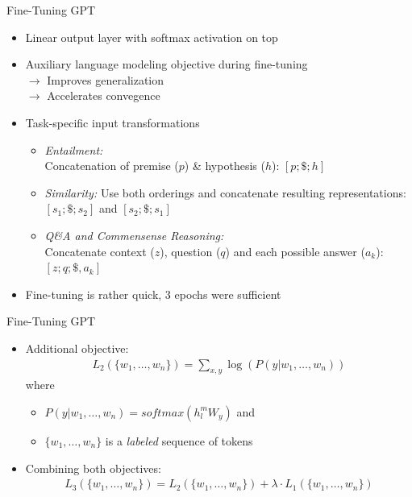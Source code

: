
\begin{vbframe}{Fine-Tuning GPT}

\vfill
			
\begin{itemize}
		\item Linear output layer with softmax activation on top
		\item Auxiliary language modeling objective during fine-tuning\\
					$\rightarrow$ Improves generalization\\
					$\rightarrow$ Accelerates convegence
		\item Task-specific input transformations
					\begin{itemize}
						\item \textit{Entailment:} \\ Concatenation of premise ($p$) \& hypothesis ($h$): $[p; \$; h]$
						\item \textit{Similarity:} Use both orderings and concatenate resulting representations: $[s_1; \$; s_2]$ and $[s_2; \$; s_1]$
						\item \textit{Q\&A and Commensense Reasoning:} \\ Concatenate context ($z$), question ($q$) and each possible answer ($a_k$): $[z; q; \$, a_k]$
					\end{itemize}
		\item Fine-tuning is rather quick, 3 epochs were sufficient
\end{itemize}

\vfill

\end{vbframe}


\begin{vbframe}{Fine-Tuning GPT}

\vfill

\begin{itemize}
		\item Additional objective:
					\begin{align*}
						L_2(\{w_1, \hdots, w_n\}) = \sum_{x,y} \log(P(y | w_1, \hdots, w_n))
					\end{align*}		
					where 
				\begin{itemize}
					\item $P(y | w_1, \hdots, w_n) = softmax(h_l^m W_y)$ and 
					\item $\{w_1, \hdots, w_n\}$ is a \textit{labeled} sequence of tokens
				\end{itemize}
		\item Combining both objectives: 
					\begin{align*}
						L_3(\{w_1, \hdots, w_n\}) = L_2(\{w_1, \hdots, w_n\}) + \lambda \cdot L_1(\{w_1, \hdots, w_n\})
					\end{align*}
\end{itemize}

\vfill

\end{vbframe}

